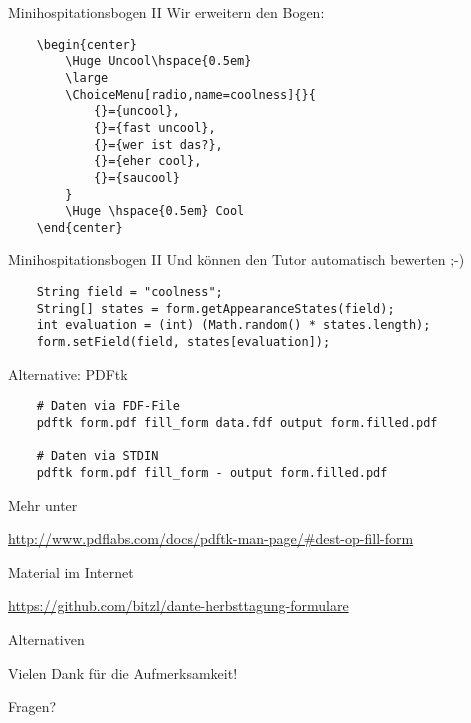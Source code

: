 \documentclass{beamer}
\begin{document}
\begin{frame}[fragile]{Minihospitationsbogen II}
Wir erweitern den Bogen:
\begin{verbatim}
	\begin{center}
	    \Huge Uncool\hspace{0.5em}
	    \large
	    \ChoiceMenu[radio,name=coolness]{}{
	        {}={uncool},
	        {}={fast uncool},
	        {}={wer ist das?},
	        {}={eher cool},
	        {}={saucool}
	    }
	    \Huge \hspace{0.5em} Cool
	\end{center}
\end{verbatim}
\end{frame}


\begin{frame}[fragile]{Minihospitationsbogen II}
Und können den Tutor automatisch bewerten ;-)

\begin{verbatim}
	String field = "coolness";
	String[] states = form.getAppearanceStates(field);
	int evaluation = (int) (Math.random() * states.length);
	form.setField(field, states[evaluation]);
\end{verbatim}
\end{frame}

\begin{frame}[fragile]{Alternative: PDFtk}

\begin{verbatim}
	# Daten via FDF-File
	pdftk form.pdf fill_form data.fdf output form.filled.pdf

	# Daten via STDIN
	pdftk form.pdf fill_form - output form.filled.pdf
\end{verbatim}

\bigskip

Mehr unter
\begin{center}
	\url{http://www.pdflabs.com/docs/pdftk-man-page/#dest-op-fill-form}
\end{center}

\end{frame}

\begin{frame}{Material im Internet}
\begin{center}
	\url{https://github.com/bitzl/dante-herbsttagung-formulare}
\end{center}
\end{frame}

\begin{frame}[fragile]{Alternativen}
\begin{center}
\Huge
Vielen Dank für die Aufmerksamkeit!

\bigskip

Fragen?
\end{center}

\end{frame}
\end{document}
